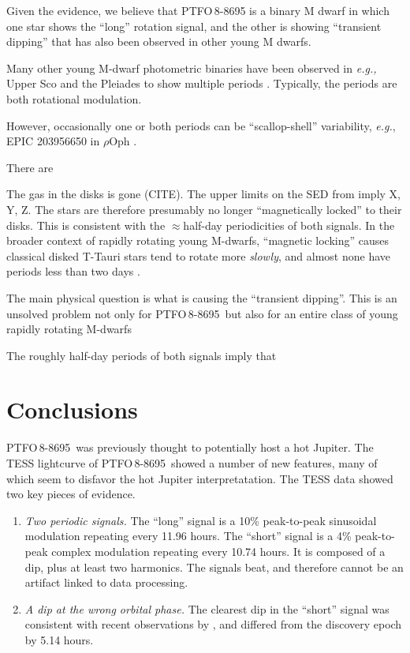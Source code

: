 \documentclass[12pt,twocolumn,tighten]{aastex62}
\newcommand{\ptfo}{PTFO$\,$8-8695}
\begin{document}
Given the evidence, we believe that PTFO$\,$8-8695 is a binary M dwarf
in which one star shows the ``long'' rotation signal, and the other is
showing ``transient dipping'' that has also been observed in other
young M dwarfs. 

Many other young M-dwarf photometric binaries have been observed in
{\it e.g.,} Upper Sco and the Pleiades to show multiple periods
\citep{rebull_usco_2018,stauffer_rotevol_2018}.  Typically, the
periods are both rotational modulation.

However, occasionally one or both periods can be ``scallop-shell''
variability, {\it e.g.}, EPIC 203956650 in $\rho$Oph
\citep{rebull_usco_2018}.




There are 

The gas in the disks is gone (CITE).
The upper limits on the SED from \citet{yu_tests_2015} imply X, Y, Z.
The stars are therefore presumably no longer ``magnetically locked''
to their disks.
This is consistent with the $\approx$half-day periodicities of both
signals.
In the broader context of rapidly rotating young M-dwarfs, ``magnetic
locking'' causes classical disked T-Tauri stars tend to rotate more
{\it slowly}, and almost none have periods less than two days
\citep[{\it e.g.},][]{rebull_rotation_2020}.

The main physical question is what is causing the ``transient
dipping''. This is an unsolved problem not only for \ptfo\ but also
for an entire class of young rapidly rotating M-dwarfs



The roughly half-day periods of both signals imply that 






\section{Conclusions}
\label{sec:conclusions}

\ptfo\ was previously thought to potentially host a hot Jupiter.
The TESS lightcurve of \ptfo\ showed a number of new features,
many of which seem to disfavor the hot Jupiter interpretatation.
The TESS data showed two key pieces of evidence.
\begin{enumerate}
  \item {\it Two periodic signals.} The ``long'' signal is a 10\%
      peak-to-peak sinusoidal modulation repeating every 11.96 hours.
      The ``short'' signal is a 4\% peak-to-peak complex modulation
      repeating every 10.74 hours. It is composed of a dip, plus at
      least two harmonics. The signals beat, and therefore cannot be
      an artifact linked to data processing.
  \item {\it A dip at the wrong orbital phase.} The clearest dip in
    the ``short'' signal was consistent with recent observations by
    \citet{tanimoto_evidence_2020}, and differed from the discovery
    epoch by 5.14 hours.
\end{enumerate}
\end{document}

